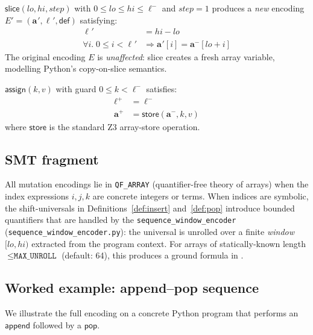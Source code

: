 \documentclass[11pt]{article}
\newcommand{\arrvar}[1]{\mathbf{a}_{#1}}
\newcommand{\lenvar}[1]{\ell_{#1}}
\newcommand{\defval}{\mathsf{def}}
\newcommand{\idx}{i}
\newcommand{\MutApp}{\ensuremath{\mathsf{append}}}
\newcommand{\MutPop}{\ensuremath{\mathsf{pop}}}
\newcommand{\MutSlice}{\ensuremath{\mathsf{slice}}}
\newcommand{\MutAssign}{\ensuremath{\mathsf{assign}}}
\newcommand{\prestate}[1]{#1^{-}}
\newcommand{\poststate}[1]{#1^{+}}
\newcommand{\QFARRAY}{\texttt{QF\_ARRAY}}
\begin{document}
\begin{definition}[Slice]\label{def:slice}
$\MutSlice(lo, hi, \mathit{step})$ with $0 \leq lo \leq hi \leq \prestate{\lenvar{}}$
and $\mathit{step} = 1$ produces a \emph{new} encoding
$E' = (\arrvar{}',\lenvar{}',\defval)$ satisfying:
\begin{align}
  \lenvar{}' &= hi - lo \tag{Slice-Len}\\
  \forall \idx.\; 0 \leq \idx < \lenvar{}' &\Rightarrow \arrvar{}'[\idx] = \prestate{\arrvar{}}[lo + \idx] \tag{Slice-Copy}
\end{align}
The original encoding $E$ is \emph{unaffected}: slice creates a fresh array
variable, modelling Python's copy-on-slice semantics.
\end{definition}

\begin{definition}\label{def:assign}
$\MutAssign(k, v)$ with guard $0 \leq k < \prestate{\lenvar{}}$ satisfies:
\begin{align}
  \poststate{\lenvar{}} &= \prestate{\lenvar{}} \tag{Asgn-Len}\\
  \poststate{\arrvar{}} &= \mathsf{store}(\prestate{\arrvar{}}, k, v) \tag{Asgn-Store}
\end{align}
where $\mathsf{store}$ is the standard Z3 array-store operation.
\end{definition}

\subsection{SMT fragment}

All mutation encodings lie in \QFARRAY{} (quantifier-free theory of arrays)
when the index expressions $i,j,k$ are concrete integers or \QFLIA{} terms.
When indices are symbolic, the shift-universals in Definitions~\ref{def:insert}
and~\ref{def:pop} introduce bounded quantifiers that are handled by the
\texttt{sequence\_window\_encoder} (\texttt{sequence\_window\_encoder.py}):
the universal is unrolled over a finite \emph{window} $[lo, hi)$ extracted
from the program context.  For arrays of statically-known length $\leq
\texttt{MAX\_UNROLL}$ (default: 64), this produces a ground formula in
\QFLIA{}.

\subsection{Worked example: append--pop sequence}\label{sec:workedexample}

We illustrate the full encoding on a concrete Python program that performs
an \MutApp{} followed by a \MutPop{}.
\end{document}
